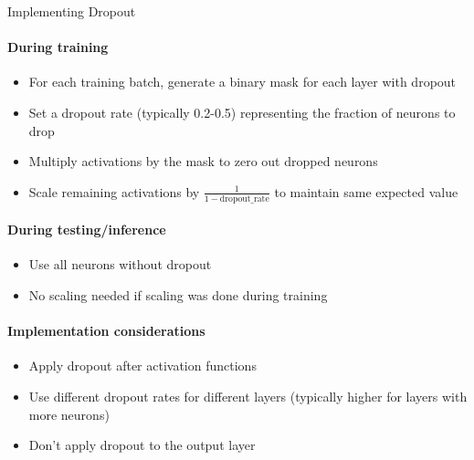 \begin{KR}{Implementing Dropout}\\
\paragraph{During training}
\begin{itemize}
    \item For each training batch, generate a binary mask for each layer with dropout
    \item Set a dropout rate (typically 0.2-0.5) representing the fraction of neurons to drop
    \item Multiply activations by the mask to zero out dropped neurons
    \item Scale remaining activations by $\frac{1}{1-\text{dropout\_rate}}$ to maintain same expected value
\end{itemize}

\paragraph{During testing/inference}
\begin{itemize}
    \item Use all neurons without dropout
    \item No scaling needed if scaling was done during training
\end{itemize}

\paragraph{Implementation considerations}
\begin{itemize}
    \item Apply dropout after activation functions
    \item Use different dropout rates for different layers (typically higher for layers with more neurons)
    \item Don't apply dropout to the output layer
\end{itemize}
\end{KR}


